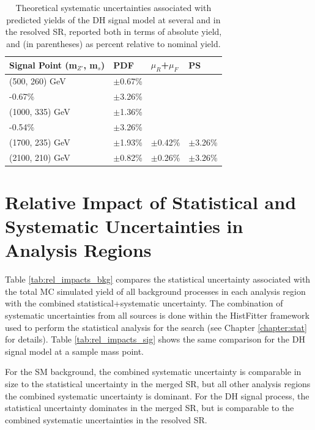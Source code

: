 \begin{table}[ht]
\begin{center}\small{
\caption{\label{tab:systs_sig_SR_res} Theoretical systematic uncertainties associated with predicted yields of the DH signal model at several \ms and \mZp in the resolved SR, reported both in terms of absolute yield, and (in parentheses) as percent relative to nominal yield.}
\begin{tabular}{l l l l }
\toprule
\textbf{Signal Point (m\({_{Z'}}\), m\(_s\))} &\textbf{PDF} &\textbf{\(\mu_R\)+\(\mu_F\)} &\textbf{PS}\tabularnewline
\midrule
\midrule
(500, 260) GeV & \(\pm\)0.67\% & \(\substack{+0.68\%\\-0.67\%}\) & \(\pm\)3.26\% \tabularnewline
\midrule
(1000, 335) GeV & \(\pm\)1.36\% & \(\substack{+0.52\%\\-0.54\%}\) & \(\pm\)3.26\% \tabularnewline
\midrule
(1700, 235) GeV & \(\pm\)1.93\% & \(\pm\)0.42\% & \(\pm\)3.26\% \tabularnewline
\midrule
(2100, 210) GeV & \(\pm\)0.82\% & \(\pm\)0.26\% & \(\pm\)3.26\% \tabularnewline
\bottomrule
\end{tabular}
}
\end{center}
\end{table}

\section{Relative Impact of Statistical and Systematic Uncertainties in Analysis Regions}

Table \ref{tab:rel_impacts_bkg} compares the statistical uncertainty associated with the total MC simulated yield of all background processes in each analysis region with the combined statistical+systematic uncertainty. The combination of systematic uncertainties from all sources is done within the HistFitter framework used to perform the statistical analysis for the search (see Chapter \ref{chapter:stat} for details). Table \ref{tab:rel_impacts_sig} shows the same comparison for the DH signal model at a sample mass point.

For the SM background, the combined systematic uncertainty is comparable in size to the statistical uncertainty in the merged SR, but all other analysis regions the combined systematic uncertainty is dominant. For the DH signal process, the statistical uncertainty dominates in the merged SR, but is comparable to the combined systematic uncertainties in the resolved SR.


